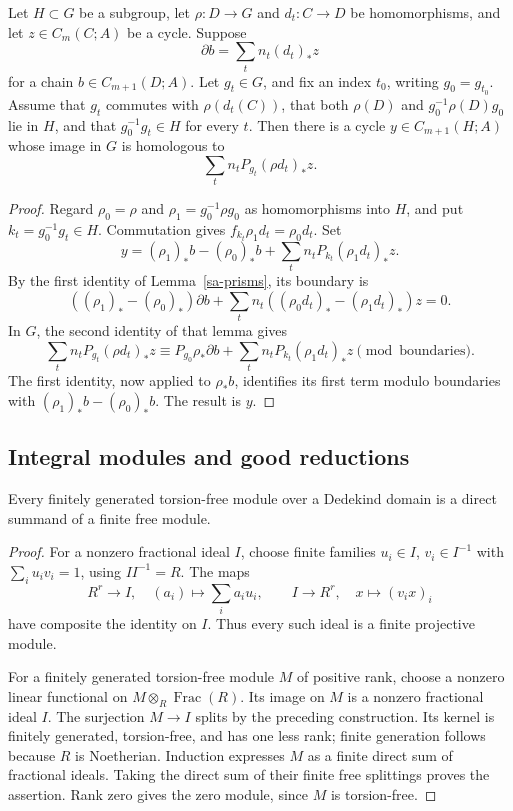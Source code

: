\begin{lemma}\label{sa-stabilizer-cycle}
Let \(H\subset G\) be a subgroup, let
\(\rho:D\to G\) and \(d_t:C\to D\) be homomorphisms,
and let \(z\in C_m(C;A)\) be a cycle.
Suppose
\[
                 \partial b=\sum_t n_t(d_t)_*z
\]
for a chain \(b\in C_{m+1}(D;A)\).
Let \(g_t\in G\), and fix an index \(t_0\), writing
\(g_0=g_{t_0}\).
Assume that \(g_t\) commutes with
\(\rho(d_t(C))\), that both \(\rho(D)\) and
\(g_0^{-1}\rho(D)g_0\) lie in \(H\), and that
\(g_0^{-1}g_t\in H\) for every \(t\).
Then there is a cycle \(y\in C_{m+1}(H;A)\)
whose image in \(G\) is homologous to
\[
                    \sum_t n_tP_{g_t}(\rho d_t)_*z.
\]
\end{lemma}
\begin{proof}
Regard \(\rho_0=\rho\) and
\(\rho_1=g_0^{-1}\rho g_0\) as homomorphisms into
\(H\), and put \(k_t=g_0^{-1}g_t\in H\).
Commutation gives
\(f_{k_t}\rho_1d_t=\rho_0d_t\).
Set
\[
 y=(\rho_1)_*b-(\rho_0)_*b
                +\sum_t n_tP_{k_t}(\rho_1d_t)_*z.
\]
By the first identity of Lemma~\ref{sa-prisms}, its
boundary is
\[
 ((\rho_1)_*-(\rho_0)_*)\partial b
       +\sum_t n_t((\rho_0d_t)_*-(\rho_1d_t)_*)z=0.
\]
In \(G\), the second identity of that lemma gives
\[
 \sum_t n_tP_{g_t}(\rho d_t)_*z
 \equiv P_{g_0}\rho_*\partial b
                 +\sum_t n_tP_{k_t}(\rho_1d_t)_*z
                    \pmod{\text{boundaries}}.
\]
The first identity, now applied to \(\rho_*b\),
identifies its first term modulo boundaries with
\((\rho_1)_*b-(\rho_0)_*b\).  The result is \(y\).
\end{proof}

\subsection{Integral modules and good reductions}

\begin{lemma}\label{sa-projective}
Every finitely generated torsion-free module over a
Dedekind domain is a direct summand of a finite free
module.
\end{lemma}
\begin{proof}
For a nonzero fractional ideal \(I\), choose finite
families \(u_i\in I\), \(v_i\in I^{-1}\) with
\(\sum_i u_iv_i=1\), using \(II^{-1}=R\).
The maps
\[
 R^r\longrightarrow I,\quad (a_i)\longmapsto\sum_i a_iu_i,
 \qquad
 I\longrightarrow R^r,\quad x\longmapsto(v_ix)_i
\]
have composite the identity on \(I\).
Thus every such ideal is a finite projective module.

For a finitely generated torsion-free module \(M\)
of positive rank, choose a nonzero linear functional
on \(M\otimes_R\operatorname{Frac}(R)\).
Its image on \(M\) is a nonzero fractional ideal
\(I\).  The surjection \(M\to I\) splits by the
preceding construction.  Its kernel is finitely
generated, torsion-free, and has one less rank;
finite generation follows because \(R\) is Noetherian.
Induction expresses \(M\) as a finite direct sum
of fractional ideals.  Taking the direct sum of
their finite free splittings proves the assertion.
Rank zero gives the zero module, since \(M\) is
torsion-free.
\end{proof}

